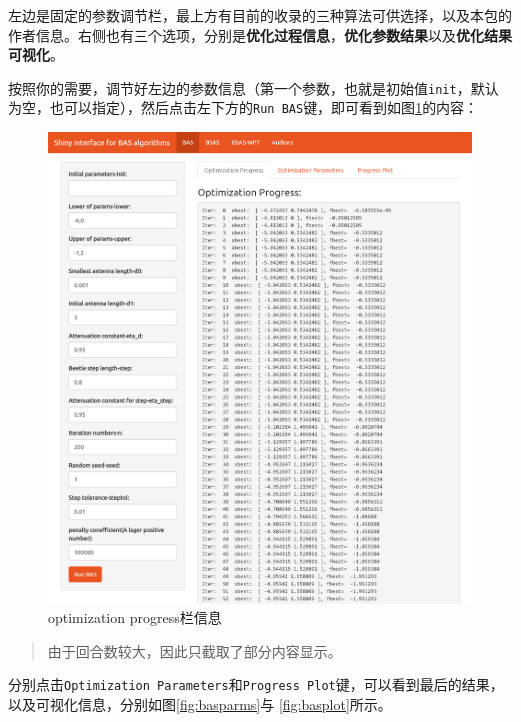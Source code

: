 \documentclass[]{ctexbook}
\theoremstyle{definition}
\theoremstyle{definition}
\theoremstyle{definition}
\theoremstyle{remark}
\begin{document}
左边是固定的参数调节栏，最上方有目前的收录的三种算法可供选择，以及本包的作者信息。右侧也有三个选项，分别是\textbf{优化过程信息}，\textbf{优化参数结果}以及\textbf{优化结果可视化}。

按照你的需要，调节好左边的参数信息（第一个参数，也就是初始值\texttt{init}，默认为空，也可以指定），然后点击左下方的\texttt{Run\ BAS}键，即可看到如图\ref{fig:basprogress}的内容：

\begin{figure}

{\centering \includegraphics[width=0.95\linewidth]{img/app2} 

}

\caption{optimization progress栏信息}\label{fig:basprogress}
\end{figure}

\begin{quote}
由于回合数较大，因此只截取了部分内容显示。
\end{quote}

分别点击\texttt{Optimization\ Parameters}和\texttt{Progress\ Plot}键，可以看到最后的结果，以及可视化信息，分别如图\ref{fig:basparms}与
\ref{fig:basplot}所示。
\end{document}
